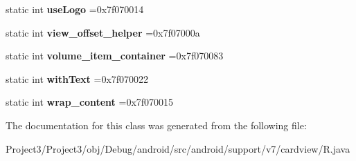 \begin{DoxyCompactItemize}
static int {\bfseries use\+Logo} =0x7f070014
\item 
\mbox{\label{classandroid_1_1support_1_1v7_1_1cardview_1_1R_1_1id_ab7a5278592a11f935f887b5bd687eebf}} 
static int {\bfseries view\+\_\+offset\+\_\+helper} =0x7f07000a
\item 
\mbox{\label{classandroid_1_1support_1_1v7_1_1cardview_1_1R_1_1id_a67d85438e06be27aeef75ea2cd6853d7}} 
static int {\bfseries volume\+\_\+item\+\_\+container} =0x7f070083
\item 
\mbox{\label{classandroid_1_1support_1_1v7_1_1cardview_1_1R_1_1id_a1bba3b0ee6e1ee41c2ee6febb27e11fa}} 
static int {\bfseries with\+Text} =0x7f070022
\item 
\mbox{\label{classandroid_1_1support_1_1v7_1_1cardview_1_1R_1_1id_a24e72a091bbb57c5ae3606e218b38089}} 
static int {\bfseries wrap\+\_\+content} =0x7f070015
\end{DoxyCompactItemize}


The documentation for this class was generated from the following file\+:\begin{DoxyCompactItemize}
\item 
Project3/\+Project3/obj/\+Debug/android/src/android/support/v7/cardview/R.\+java\end{DoxyCompactItemize}
